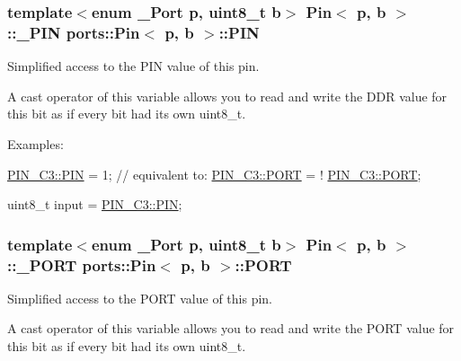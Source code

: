 \subsubsection[{\texorpdfstring{P\+IN}{PIN}}]{\setlength{\rightskip}{0pt plus 5cm}template$<$enum \+\_\+\+Port p, uint8\+\_\+t b$>$ {\bf Pin}$<$ p, b $>$\+::{\bf \+\_\+\+P\+IN} {\bf ports\+::\+Pin}$<$ p, b $>$\+::P\+IN\hspace{0.3cm}{\ttfamily [static]}}\hypertarget{structports_1_1Pin_ae2e45a41082457c350f71f7a720265d4}{}\label{structports_1_1Pin_ae2e45a41082457c350f71f7a720265d4}


Simplified access to the P\+IN value of this pin. 

A cast operator of this variable allows you to read and write the D\+DR value for this bit as if every bit had its own uint8\+\_\+t.

Examples\+:


\begin{DoxyItemize}
\item {\ttfamily \hyperlink{structports_1_1Pin_ae2e45a41082457c350f71f7a720265d4}{P\+I\+N\+\_\+\+C3\+::\+P\+IN} = 1; // equivalent to\+: \hyperlink{structports_1_1Pin_aaa08f0eb17ef31d9f46d65d50c8a093e}{P\+I\+N\+\_\+\+C3\+::\+P\+O\+RT} = ! \hyperlink{structports_1_1Pin_aaa08f0eb17ef31d9f46d65d50c8a093e}{P\+I\+N\+\_\+\+C3\+::\+P\+O\+RT};}
\item {\ttfamily uint8\+\_\+t input = \hyperlink{structports_1_1Pin_ae2e45a41082457c350f71f7a720265d4}{P\+I\+N\+\_\+\+C3\+::\+P\+IN};} 
\end{DoxyItemize}
\subsubsection[{\texorpdfstring{P\+O\+RT}{PORT}}]{\setlength{\rightskip}{0pt plus 5cm}template$<$enum \+\_\+\+Port p, uint8\+\_\+t b$>$ {\bf Pin}$<$ p, b $>$\+::{\bf \+\_\+\+P\+O\+RT} {\bf ports\+::\+Pin}$<$ p, b $>$\+::P\+O\+RT\hspace{0.3cm}{\ttfamily [static]}}\hypertarget{structports_1_1Pin_aaa08f0eb17ef31d9f46d65d50c8a093e}{}\label{structports_1_1Pin_aaa08f0eb17ef31d9f46d65d50c8a093e}


Simplified access to the P\+O\+RT value of this pin. 

A cast operator of this variable allows you to read and write the P\+O\+RT value for this bit as if every bit had its own {\ttfamily uint8\+\_\+t}.

